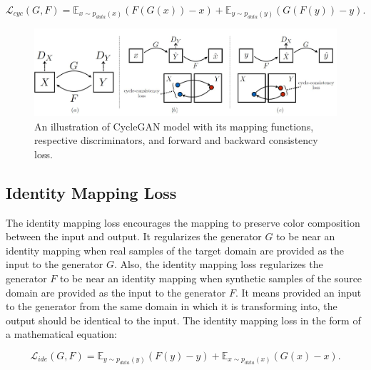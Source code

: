\begin{equation}\label{CycleConsistencyLossEquation}
    \mathcal{L}_{cyc}(G, F) = \mathbb{E}_{x \sim p_{data}(x)} (F(G(x)) - x) + \mathbb{E}_{y \sim p_{data}(y)} (G(F(y)) - y).
\end{equation}

\begin{figure}[H]
	    \begin{center} \includegraphics[scale=0.5]{images/Methodology/CycleGAN.jpg}
	    \caption[An illustration of \ac{CycleGAN} model with its mapping functions, respective discriminators, and forward and backward consistency loss.]{An illustration of \ac{CycleGAN} model with its mapping functions, respective discriminators, and forward and backward consistency loss\cite{zhu2020unpaired}.}
	    \label{fig:CycleGAN}
	    \end{center}
\end{figure}

\subsection{Identity Mapping Loss}

The identity mapping loss encourages the mapping to preserve color composition between the input and output\cite{taigman2016unsupervised}. It regularizes the generator $G$ to be near an identity mapping when real samples of the target domain are provided as the input to the generator $G$. Also, the identity mapping loss regularizes the generator $F$ to be near an identity mapping when synthetic samples of the source domain are provided as the input to the generator $F$. It means provided an input to the generator from the same domain in which it is transforming into, the output should be identical to the input. The identity mapping loss in the form of a mathematical equation:

\begin{equation}\label{IdentityMappingLoss}
    \mathcal{L}_{ide}(G, F) = \mathbb{E}_{y \sim p_{data}(y)}(F(y) - y) + \mathbb{E}_{x \sim p_{data}(x)}(G(x) - x).
    \end{equation}

